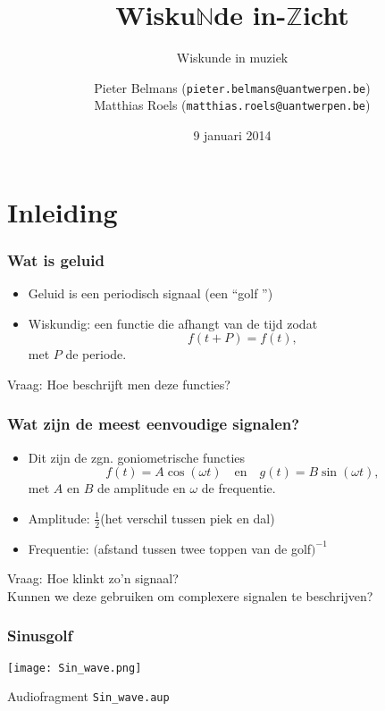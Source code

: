 \documentclass[compress, darktitle, framenumber]{beamer}
\title{Wisku$\mathbb{N}$de in-$\mathbb{Z}$icht}
\subtitle{Wiskunde in muziek}
\author{Pieter Belmans (\texttt{pieter.belmans@uantwerpen.be}) \\ Matthias Roels (\texttt{matthias.roels@uantwerpen.be})}
\date{9 januari 2014}
\begin{document}
\begin{frame}
  \titlepage
\end{frame}

\section{Inleiding}

\begin{frame}
\frametitle{Wat is geluid}
\begin{itemize}
\item Geluid is een periodisch signaal (een ``golf '') 
\item Wiskundig: een functie die afhangt van de tijd zodat $$f(t+P)=f(t),$$ met $P$ de periode.
\end{itemize}
\begin{alertblock}{Vraag:}
Hoe beschrijft men deze functies? 
\end{alertblock}
\end{frame}

\begin{frame}
\frametitle{Wat zijn de meest eenvoudige signalen?}
\begin{itemize}
\item Dit zijn de zgn. goniometrische functies $$f(t)=A\cos (\omega t) \quad \text{en} \quad g(t)=B\sin (\omega t),$$ met $A$ en $B$ de amplitude en $\omega$ de frequentie. 
\item Amplitude: $\frac{1}{2}$(het verschil tussen piek en dal)
\item Frequentie: $($afstand tussen twee toppen van de golf$)^{-1}$
\end{itemize}
\begin{alertblock}{Vraag:}
Hoe klinkt zo'n signaal? \\
Kunnen we deze gebruiken om complexere signalen te beschrijven?  
\end{alertblock}
\end{frame}

\begin{frame}
\frametitle{Sinusgolf}
\texttt{[image: Sin\_wave.png]}
\begin{block}{Audiofragment}
\texttt{Sin\_wave.aup}
\end{block}
\end{frame}
\end{document}
